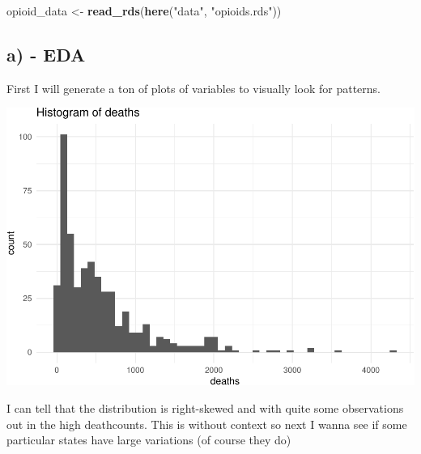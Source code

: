 \documentclass[]{article}
\newenvironment{Shaded}{\begin{snugshade}}{\end{snugshade}}
\newcommand{\DataTypeTok}[1]{\textcolor[rgb]{0.13,0.29,0.53}{#1}}
\newcommand{\DecValTok}[1]{\textcolor[rgb]{0.00,0.00,0.81}{#1}}
\newcommand{\KeywordTok}[1]{\textcolor[rgb]{0.13,0.29,0.53}{\textbf{#1}}}
\newcommand{\NormalTok}[1]{#1}
\newcommand{\OperatorTok}[1]{\textcolor[rgb]{0.81,0.36,0.00}{\textbf{#1}}}
\newcommand{\StringTok}[1]{\textcolor[rgb]{0.31,0.60,0.02}{#1}}
\begin{document}
\begin{Shaded}
\begin{Highlighting}[]
\NormalTok{opioid_data <-}\StringTok{ }\KeywordTok{read_rds}\NormalTok{(}\KeywordTok{here}\NormalTok{(}\StringTok{"data"}\NormalTok{, }\StringTok{"opioids.rds"}\NormalTok{))}
\end{Highlighting}
\end{Shaded}

\hypertarget{a---eda}{%
\subsection{a) - EDA}\label{a---eda}}

First I will generate a ton of plots of variables to visually look for
patterns.

\begin{Shaded}
\end{Shaded}

\includegraphics{Assignment_1_files/figure-latex/death distributions-1.pdf}

I can tell that the distribution is right-skewed and with quite some
observations out in the high deathcounts. This is without context so
next I wanna see if some particular states have large variations (of
course they do)
\end{document}
